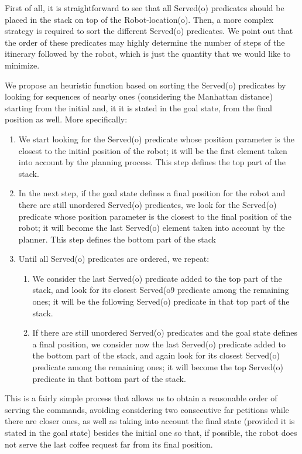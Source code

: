 \documentclass[12pt,a4paper,oneside]{article}
\numberwithin{equation}{section}
\numberwithin{equation}{section}
\theoremstyle{definition}
\begin{document}
First of all, it is straightforward to see that all Served(o) predicates should be placed in the stack on top of the Robot-location(o). Then, a more complex strategy is required to sort the different Served(o) predicates. We point out that the order of these predicates may highly determine the number of steps of the itinerary followed by the robot, which is just the quantity that we would like to minimize. 


We propose an heuristic function based on sorting the Served(o) predicates by looking for sequences of nearby ones (considering the Manhattan distance) starting from the initial and, it it is stated in the goal state, from the final position as well. More specifically:
\begin{enumerate}
	\item We start looking for the Served(o) predicate whose position parameter is the closest to the initial position of the robot; it will be the first element taken into account by the planning process. This step defines the top part of the stack.
	\item In the next step, if the goal state defines a final position for the robot and there are still unordered Served(o) predicates, we look for the Served(o) predicate whose position parameter is the closest to the final position of the robot; it will become the last Served(o) element taken into account by the planner. This step defines the bottom part of the stack
	\item Until all Served(o) predicates are ordered, we repeat:
	\begin{enumerate}
		\item We consider the last Served(o) predicate added to the top part of the stack, and look for its closest Served(o9 predicate among the remaining ones; it will be the following Served(o) predicate in that top part of the stack.
		\item If there are still unordered Served(o) predicates and the goal state defines a final position, we consider now the last Served(o) predicate added to the bottom part of the stack, and again look for its closest Served(o) predicate among the remaining ones; it will become the top Served(o) predicate in that bottom part of the stack.
	\end{enumerate}
\end{enumerate}
This is a fairly simple process that allows us to obtain a reasonable order of serving the commands, avoiding considering two consecutive far petitions while there are closer ones, as well as taking into account the final state (provided it is stated in the goal state) besides the initial one so that, if possible, the robot does not serve the last coffee request far from its final position. 
\end{document}
